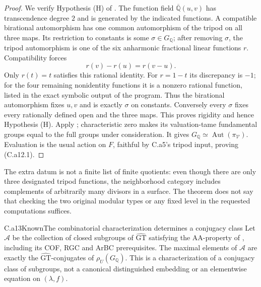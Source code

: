 \begin{proof}
We verify Hypothesis (H) of \citet[Definition/Remark 2.2]{Pop2018arith}.
The function field $\overline{\mathbb Q}(u,v)$ has transcendence degree
$2$ and is generated by the indicated functions. A compatible birational
automorphism has one common automorphism of the tripod on all three
maps. Its restriction to constants is some $\sigma\in G_{\mathbb Q}$;
after removing $\sigma$, the tripod automorphism is one of the six
anharmonic fractional linear functions $r$. Compatibility forces
\[
 r(v)-r(u)=r(v-u).
\]
Only $r(t)=t$ satisfies this rational identity. For $r=1-t$ its discrepancy
is $-1$; for the four remaining nonidentity functions it is a nonzero
rational function, listed in the exact symbolic output of the program.
Thus the birational automorphism fixes $u,v$ and is exactly $\sigma$ on
constants. Conversely every $\sigma$ fixes every rationally defined
open and the three maps. This proves rigidity and hence Hypothesis (H).
Apply \citet[Theorem 2.7(1)]{Pop2018arith}; characteristic zero makes its
valuation-tame fundamental groups equal to the full groups under
consideration. It gives $G_{\mathbb Q}\simeq
\operatorname{Aut}(\pi_{\mathcal V})$. Evaluation is the usual action
on $F$, faithful by C.a5's tripod input, proving (C.a12.1).
\end{proof}
The extra datum is not a finite list of finite quotients: even though
there are only three designated tripod functions, the neighborhood
category includes complements of arbitrarily many divisors in a
surface. The theorem does not say that checking the two original
modular types or any fixed level in the requested computations suffices.

\begin{claim}{C.a13}{Known}{The combinatorial characterization determines a conjugacy class}
Let $\mathcal A$ be the collection of closed subgroups of
$\widehat{\mathrm{GT}}$ satisfying the AA-property of
\citet[Definition 5.12]{HMT2025arith}, including its COF, RGC and
ArBC prerequisites. The maximal elements of
$\mathcal A$ are exactly the
$\widehat{\mathrm{GT}}$-conjugates of $\rho_U(G_{\mathbb Q})$.
This is a characterization of a conjugacy class of subgroups, not a
canonical distinguished embedding or an elementwise equation on
$(\lambda,f)$.
\end{claim}


